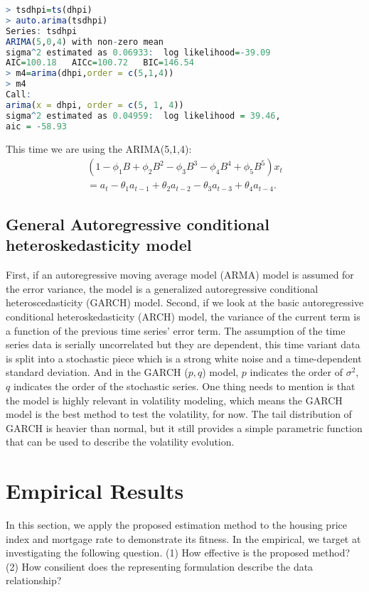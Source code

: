 \documentclass[12pt,letterpaper]{article}
\begin{document}
{\footnotesize
\begin{lstlisting}[language=R]
> tsdhpi=ts(dhpi)
> auto.arima(tsdhpi)
Series: tsdhpi 
ARIMA(5,0,4) with non-zero mean 
sigma^2 estimated as 0.06933:  log likelihood=-39.09
AIC=100.18   AICc=100.72   BIC=146.54
> m4=arima(dhpi,order = c(5,1,4))
> m4
Call:
arima(x = dhpi, order = c(5, 1, 4))
sigma^2 estimated as 0.04959:  log likelihood = 39.46,  
aic = -58.93
\end{lstlisting}
}

This time we are using the ARIMA(5,1,4):
\begin{equation}
\begin{aligned}
(1-\phi_1B+\phi_2B^2-\phi_3B^3-\phi_4B^4+\phi_5B^5)x_t \\
= a_t -\theta_1 a_{t-1}+\theta_2a_{t-2}-\theta_3a_{t-3}+\theta_4a_{t-4}.
\end{aligned}
\end{equation}

\subsection{General Autoregressive conditional heteroskedasticity model}
First, if an autoregressive moving average model (ARMA) model is assumed for the error variance, the model is a generalized autoregressive conditional heteroscedasticity (GARCH) model.
Second, if we look at the basic autoregressive conditional heteroskedasticity (ARCH) model, the variance of the current term is a function of the previous time series' error term. 
The assumption of the time series data is serially uncorrelated but they are dependent, this time variant data is split into a stochastic piece which is a strong white noise and a time-dependent standard deviation.
And in the GARCH ($p,q$) model, $p$ indicates the order of $\sigma^2$, $q$ indicates the order of the stochastic series.
One thing needs to mention is that the model is highly relevant in volatility modeling, which means the GARCH model is the best method to test the volatility, for now.
The tail distribution of GARCH is heavier than normal, but it still provides a simple parametric function that can be used to describe the volatility evolution. 


\section{Empirical Results}
In this section, we apply the proposed estimation method to the housing price index and mortgage rate to demonstrate its fitness. 
In the empirical, we target at investigating the following question. 
(1) How effective is the proposed method? 
(2) How consilient does the representing formulation describe the data relationship? 
\end{document}
